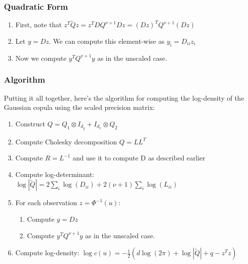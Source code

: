 \documentclass[
  12pt]{article}
\providecommand{\tightlist}{%
  \setlength{\itemsep}{0pt}\setlength{\parskip}{0pt}}\usepackage{longtable,booktabs,array}
\begin{document}
\subsubsection{Quadratic Form}\label{quadratic-form}

\begin{enumerate}
\def\labelenumi{\arabic{enumi}.}
\tightlist
\item
  First, note that
  \(z^T\tilde{Q}z = z^TDQ^{\nu+1}Dz = (Dz)^TQ^{\nu+1}(Dz)\)
\item
  Let \(y = Dz\). We can compute this element-wise as
  \(y_i = D_{ii}z_i\)
\item
  Now we compute \(y^TQ^{\nu+1}y\) as in the unscaled case.
\end{enumerate}

\subsubsection{Algorithm}\label{algorithm-1}

Putting it all together, here's the algorithm for computing the
log-density of the Gaussian copula using the scaled precision matrix:

\begin{enumerate}
\def\labelenumi{\arabic{enumi}.}
\tightlist
\item
  Construct \(Q = Q_1 \otimes I_{d_y} + I_{d_x} \otimes Q_2\)
\item
  Compute Cholesky decomposition \(Q = LL^T\)
\item
  Compute \(R = L^{-1}\) and use it to compute D as described earlier
\item
  Compute log-determinant:
  \(\log|\tilde{Q}| = 2\sum_i \log(D_{ii}) + 2(\nu+1)\sum_i \log(L_{ii})\)
\item
  For each observation \(z = \Phi^{-1}(u)\):

  \begin{enumerate}
  \def\labelenumii{\roman{enumii})}
  \tightlist
  \item
    Compute \(y = Dz\)
  \item
    Compute \(y^TQ^{\nu+1}y\) as in the unscaled case.
  \end{enumerate}
\item
  Compute log-density:
  \(\log c(u) = -\frac{1}{2}(d\log(2\pi) + \log|\tilde{Q}| + q - z^Tz)\)
\end{enumerate}


  
\end{document}
